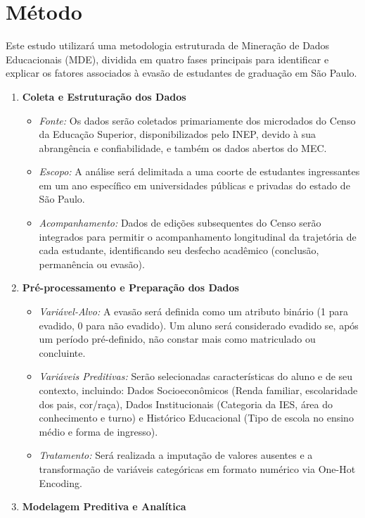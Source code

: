 \documentclass[brazilian, english, spanish]{RBIEarticle}
\begin{document}
\section{Método}
Este estudo utilizará uma metodologia estruturada de Mineração de Dados Educacionais (MDE), dividida em quatro fases principais para identificar e explicar os fatores associados à evasão de estudantes de graduação em São Paulo.
\begin{enumerate}
    \item \textbf{Coleta e Estruturação dos Dados}
    \begin{itemize}
        \item \textit{Fonte:} Os dados serão coletados primariamente dos microdados do Censo da Educação Superior, disponibilizados pelo INEP, devido à sua abrangência e confiabilidade, e também os dados abertos do MEC.
        \item \textit{Escopo:} A análise será delimitada a uma coorte de estudantes ingressantes em um ano específico em universidades públicas e privadas do estado de São Paulo.
        \item \textit{Acompanhamento:} Dados de edições subsequentes do Censo serão integrados para permitir o acompanhamento longitudinal da trajetória de cada estudante, identificando seu desfecho acadêmico (conclusão, permanência ou evasão).
    \end{itemize}
    \item \textbf{Pré-processamento e Preparação dos Dados}
    \begin{itemize}
        \item \textit{Variável-Alvo:} A evasão será definida como um atributo binário (1 para evadido, 0 para não evadido). Um aluno será considerado evadido se, após um período pré-definido, não constar mais como matriculado ou concluinte.
        \item \textit{Variáveis Preditivas:} Serão selecionadas características do aluno e de seu contexto, incluindo: Dados Socioeconômicos (Renda familiar, escolaridade dos pais, cor/raça), Dados Institucionais (Categoria da IES, área do conhecimento e turno) e Histórico Educacional (Tipo de escola no ensino médio e forma de ingresso).
        \item \textit{Tratamento:} Será realizada a imputação de valores ausentes e a transformação de variáveis categóricas em formato numérico via One-Hot Encoding.
    \end{itemize}
    \item \textbf{Modelagem Preditiva e Analítica}

\end{enumerate}
\end{document}
